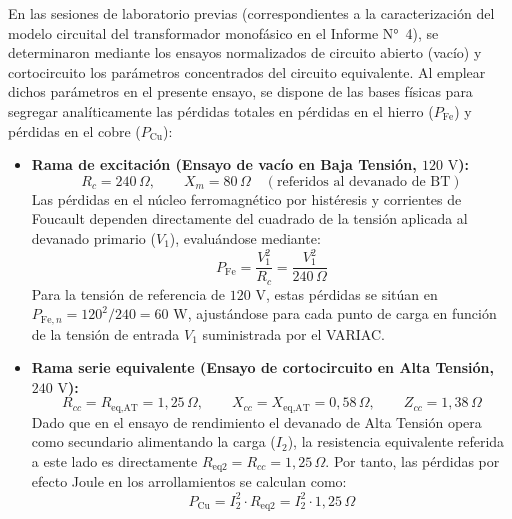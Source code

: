 En las sesiones de laboratorio previas (correspondientes a la caracterización del modelo circuital del transformador monofásico en el Informe N°~4), se determinaron mediante los ensayos normalizados de circuito abierto (vacío) y cortocircuito los parámetros concentrados del circuito equivalente. Al emplear dichos parámetros en el presente ensayo, se dispone de las bases físicas para segregar analíticamente las pérdidas totales en pérdidas en el hierro ($P_{\text{Fe}}$) y pérdidas en el cobre ($P_{\text{Cu}}$):
\begin{itemize}
    \item \textbf{Rama de excitación (Ensayo de vacío en Baja Tensión, $120\text{ V}$):}
    \begin{equation}
        R_c = 240\,\Omega, \qquad X_m = 80\,\Omega \quad (\text{referidos al devanado de BT})
    \end{equation}
    Las pérdidas en el núcleo ferromagnético por histéresis y corrientes de Foucault dependen directamente del cuadrado de la tensión aplicada al devanado primario ($V_1$), evaluándose mediante:
    \begin{equation}
        P_{\text{Fe}} = \frac{V_1^2}{R_c} = \frac{V_1^2}{240\,\Omega}
        \label{eq:pfe_modelo}
    \end{equation}
    Para la tensión de referencia de $120\text{ V}$, estas pérdidas se sitúan en $P_{\text{Fe},n} = 120^2 / 240 = 60\text{ W}$, ajustándose para cada punto de carga en función de la tensión de entrada $V_1$ suministrada por el VARIAC.
    
    \item \textbf{Rama serie equivalente (Ensayo de cortocircuito en Alta Tensión, $240\text{ V}$):}
    \begin{equation}
        R_{cc} = R_{\text{eq,AT}} = 1{,}25\,\Omega, \qquad X_{cc} = X_{\text{eq,AT}} = 0{,}58\,\Omega, \qquad Z_{cc} = 1{,}38\,\Omega
    \end{equation}
    Dado que en el ensayo de rendimiento el devanado de Alta Tensión opera como secundario alimentando la carga ($I_2$), la resistencia equivalente referida a este lado es directamente $R_{\text{eq2}} = R_{cc} = 1{,}25\,\Omega$. Por tanto, las pérdidas por efecto Joule en los arrollamientos se calculan como:
    \begin{equation}
        P_{\text{Cu}} = I_2^2 \cdot R_{\text{eq2}} = I_2^2 \cdot 1{,}25\,\Omega
        \label{eq:pcu_modelo}
    \end{equation}
\end{itemize}

